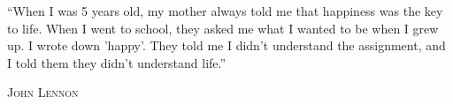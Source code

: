 \documentclass[48pt,extrafontsizes,oneside]{memoir}
\begin{document}
\epigraph{``When I was 5 years old, my mother always told me that happiness
was the key to life. When I went to school, they asked me what I
wanted to be when I grew up. I wrote down 'happy'. They told me I
didn't understand the assignment, and I told them they didn't
understand life.''}{\scshape{John Lennon}}
\end{document}
